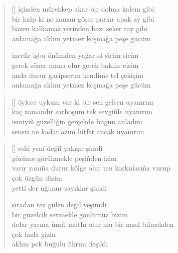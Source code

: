\documentclass[10pt, openright, twoside]{memoir}
\theoremstyle{definition}
\begin{document}
\vspace*{\fill}
%
\newpage
{}
\vspace*{\fill}
\settowidth{\versewidth}{bir kalp ki ne zaman görse parlar apak ay gibi}
\begin{verse}[\versewidth]
  içinden mürekkep akar bir dolma kalem gibi \\
  bir kalp ki ne zaman görse parlar apak ay gibi \\
  bazen kalkamaz yerinden bazı seker tay gibi \\
  anlamağa aklım yetmez koşmağa peşe gücüm

  incelir işbu önümden yağar ol sicim sicim \\
  gerek söner mana olur gerek bakılır cisim \\
  anda durur garipserim kendime tel çekişim \\
  anlamağa aklım yetmez koşmağa peşe gücüm \\
\end{verse}
\vspace*{\fill}
%
\newpage
{}
\vspace*{\fill}
\settowidth{\versewidth}{kaç zamandır sarhoşum tek sevgi\~nle uyanırım}
\begin{verse}[\versewidth]
  öylece uykum var ki bir sen gelsen uyanırım \\
  kaç zamandır sarhoşum tek sevgi\~nle uyanırım \\
  ismiyi\~n güzelliğin gerçekde bugün anladım \\
  sensiz ne kadar azım lütfet ancak uyanırım \\
\end{verse}
\vspace*{\fill}
%
\newpage
{}
\vspace*{\fill}
\settowidth{\versewidth}{varır yanı\~na durur kölge olur mu korkuları\~na vurup}
\begin{verse}[\versewidth]
  eski yeni değil yakışır şimdi \\
  gözüme görükmekle peşi\~nden izim \\
  varır yanı\~na durur kölge olur mu korkuları\~na vurup \\
  çok üzgün dizim \\
  yetti der uğunur sayıklar şimdi

  sıradan tez gülen değil yeşimdi \\
  bir güzelcik sevmekle gönlümüz bizim \\
  dolar yarına ümit mutlu olur mu bir nasıl bilmekden \\
  çok fazla gizin \\
  aklım pek buğulu fikrim deşildi \\
\end{verse}
\end{document}
